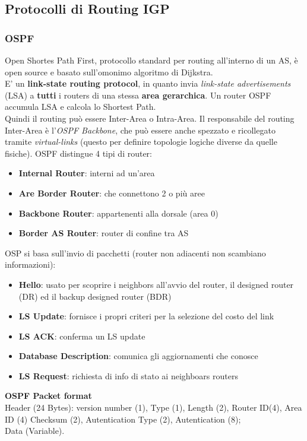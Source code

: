 \documentclass[a4paper,11pt]{article}
\begin{document}
\subsection{Protocolli di Routing IGP} 
\subsubsection{OSPF}
Open Shortes Path First, protocollo standard per routing all'interno di un AS, è open source e basato sull'omonimo algoritmo di Dijkstra.\\
E' un \textbf{link-state routing protocol}, in quanto invia \textit{link-state advertisements} (LSA) a \textbf{tutti} i routers di una stessa \textbf{area gerarchica}. Un router OSPF accumula LSA e calcola lo Shortest Path.\\
Quindi il routing può essere Inter-Area o Intra-Area. Il responsabile del routing Inter-Area è l'\textit{OSPF Backbone}, che può essere anche spezzato e ricollegato tramite \textit{virtual-links} (questo per definire topologie logiche diverse da quelle fisiche).
OSPF distingue 4 tipi di router:
\begin{itemize}
\item\textbf{Internal Router}: interni ad un'area
\item\textbf{Are Border Router}: che connettono 2 o più aree
\item\textbf{Backbone Router}: appartenenti alla dorsale (area 0)
\item\textbf{Border AS Router}: router di confine tra AS
\end{itemize}
OSP si basa sull'invio di pacchetti (router non adiacenti non scambiano informazioni):
\begin{itemize}
\item\textbf{Hello}: usato per scoprire i neighbors all'avvio del router, il designed router (DR) ed il backup designed router (BDR)
\item\textbf{LS Update}: fornisce i propri criteri per la selezione del costo del link
\item\textbf{LS ACK}: conferma un LS update
\item\textbf{Database Description}: comunica gli aggiornamenti che conosce
\item\textbf{LS Request}: richiesta di info di stato ai neighboars routers
\end{itemize}
\textbf{OSPF Packet format}\\Header (24 Bytes): version number (1), Type (1), Length (2), Router ID(4), Area ID (4) Checksum (2), Autentication Type (2), Autentication (8); \\Data (Variable).
                                                                                                                     \newpage
\end{document}
